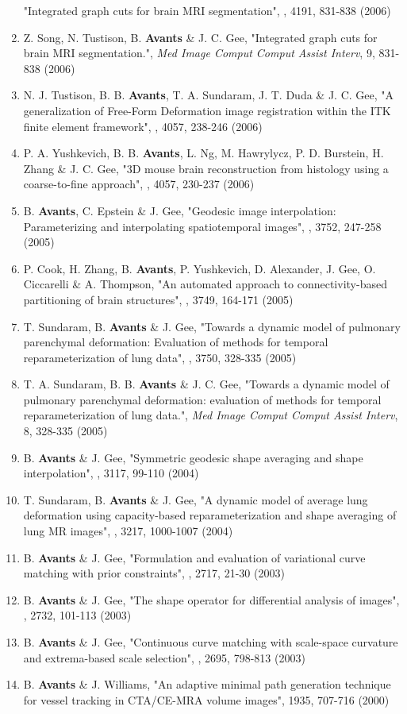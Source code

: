 \documentclass[11pt]{moderncv} %
\begin{document}
\begin{enumerate}
"Integrated graph cuts for brain MRI segmentation",
, 4191, 831-838 (2006)
\item Z. Song, N. Tustison, B. \textbf{Avants} \&  J. C. Gee,
"Integrated graph cuts for brain MRI segmentation.",
{\em Med Image Comput Comput Assist Interv}, 9, 831-838 (2006)
\item N. J. Tustison, B. B. \textbf{Avants}, T. A. Sundaram, J. T. Duda \&  J. C. Gee,
"A generalization of Free-Form Deformation image registration within the ITK finite element framework",
, 4057, 238-246 (2006)
\item P. A. Yushkevich, B. B. \textbf{Avants}, L. Ng, M. Hawrylycz, P. D. Burstein, H. Zhang \&  J. C. Gee,
"3D mouse brain reconstruction from histology using a coarse-to-fine approach",
, 4057, 230-237 (2006)
\item B. \textbf{Avants}, C. Epstein \&  J. Gee,
"Geodesic image interpolation: Parameterizing and interpolating spatiotemporal images",
, 3752, 247-258 (2005)
\item P. Cook, H. Zhang, B. \textbf{Avants}, P. Yushkevich, D. Alexander, J. Gee, O. Ciccarelli \&  A. Thompson,
"An automated approach to connectivity-based partitioning of brain structures",
, 3749, 164-171 (2005)
\item T. Sundaram, B. \textbf{Avants} \&  J. Gee,
"Towards a dynamic model of pulmonary parenchymal deformation: Evaluation of methods for temporal reparameterization of lung data",
, 3750, 328-335 (2005)
\item T. A. Sundaram, B. B. \textbf{Avants} \&  J. C. Gee,
"Towards a dynamic model of pulmonary parenchymal deformation: evaluation of methods for temporal reparameterization of lung data.",
{\em Med Image Comput Comput Assist Interv}, 8, 328-335 (2005)
\item B. \textbf{Avants} \&  J. Gee,
"Symmetric geodesic shape averaging and shape interpolation",
, 3117, 99-110 (2004)
\item T. Sundaram, B. \textbf{Avants} \&  J. Gee,
"A dynamic model of average lung deformation using capacity-based reparameterization and shape averaging of lung MR images",
, 3217, 1000-1007 (2004)
\item B. \textbf{Avants} \&  J. Gee,
"Formulation and evaluation of variational curve matching with prior constraints",
, 2717, 21-30 (2003)
\item B. \textbf{Avants} \&  J. Gee,
"The shape operator for differential analysis of images", , 2732, 101-113 (2003)
\item B. \textbf{Avants} \&  J. Gee,
"Continuous curve matching with scale-space curvature and extrema-based scale selection",
, 2695, 798-813 (2003)
\item B. \textbf{Avants} \&  J. Williams,
"An adaptive minimal path generation technique for vessel tracking in
CTA/CE-MRA volume images", 1935, 707-716 (2000)
\end{enumerate}
\end{document}
